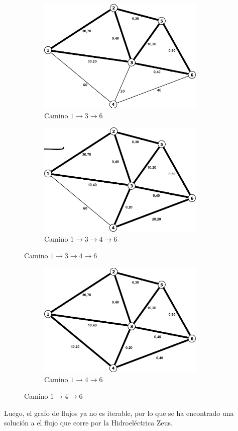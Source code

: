 \documentclass[12pt,letterpaper]{article}
\begin{document}
\begin{figure}[htbp]
        \begin{subfigure}[htbp]{8cm}
                \centering
                \includegraphics[width=8cm]{./it4.png}
                \caption{Camino $1\to3\to6$}
        \end{subfigure}
        \begin{subfigure}[htbp]{8cm}
                \centering
                \includegraphics[width=8cm]{./it5.png}
                \caption{Camino $1\to3\to4\to6$}
        \end{subfigure}
\end{figure}

\begin{figure}[htbp]
        \begin{subfigure}[htbp]{8cm}
                \centering
                \includegraphics[width=8cm]{./it6.png}
                \caption{Camino $1\to4\to6$}
        \end{subfigure}
\end{figure}
\newpage
Luego, el grafo de flujos ya no es iterable, por lo que se ha encontrado una solución a el flujo que corre por la Hidroeléctrica Zeus.
\end{document}
